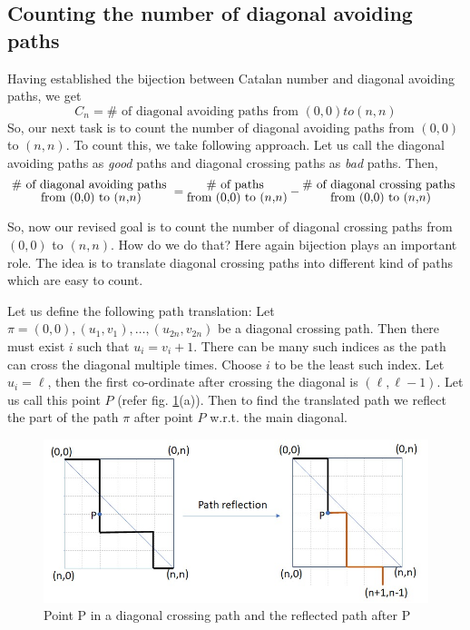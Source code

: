 
\subsection{Counting the number of diagonal avoiding paths} 
Having established the bijection between Catalan number and diagonal avoiding paths, we get  
\begin{equation}
\label{eq:catalan-expr-1}
    C_n = \# \text{ of diagonal avoiding paths from } (0,0) to (n,n) 
\end{equation}
So, our next task is to count the number of diagonal avoiding paths from $(0,0)$ to $(n,n)$. 
To count this, we take following approach. Let us call the diagonal avoiding paths as \textit{good} paths and diagonal crossing paths as \textit{bad} paths. Then,
\begin{equation}
\label{eq:no-of-good-paths}
\Large
    \substack{\text{\# of diagonal avoiding paths }\\ \text{from } (0,0) \text{ to } (n,n)}  = \substack{\text{\# of paths }\\ \text{from } (0,0) \text{ to } (n,n)} - \substack{\text{\# of diagonal crossing paths }\\ \text{from } (0,0) \text{ to } (n,n)}
\end{equation}  

So, now our revised goal is to count the number of diagonal crossing paths from $(0,0)$ to $(n,n)$. How do we do that? Here again bijection plays an important role. The idea is to translate diagonal crossing paths into  different kind of paths which are easy to count. 

Let us define the following path translation:  Let $\pi=(0,0), (u_1,v_1), \ldots, (u_{2n}, v_{2n})$ be  a diagonal crossing path. Then there must exist $i$ such that $u_i = v_i+1$. There can be many such indices as the path can cross the diagonal multiple times. Choose $i$ to be the least such index. Let $u_i = \ell$, then the first co-ordinate after crossing the diagonal is $(\ell, \ell-1)$. Let us call this point $P$ (refer fig. \ref{fig:reflecting-path}(a)). Then to find the translated path we reflect the part of the path $\pi$ after point $P$ w.r.t. the main diagonal. 

\begin{figure}[h!]
    \centering
    \includegraphics[width=0.7\linewidth]{reflecting-path.jpeg}
    \caption{Point P in a diagonal crossing path and the reflected path after P}
    \label{fig:reflecting-path}
\end{figure}

